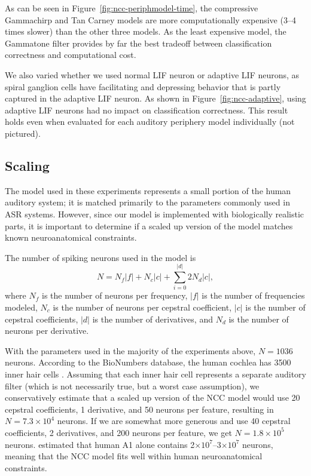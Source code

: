 
As can be seen in Figure~\ref{fig:ncc-periphmodel-time},
the compressive Gammachirp
and Tan Carney models are
more computationally expensive
(3--4 times slower)
than the other three models.
As the least expensive model,
the Gammatone filter
provides by far the best tradeoff
between classification correctness
and computational cost.


We also varied whether we used
normal LIF neuron or adaptive LIF neurons,
as spiral ganglion cells
have facilitating and depressing behavior
that is partly captured in the adaptive LIF neuron.
As shown in Figure~\ref{fig:ncc-adaptive},
using adaptive LIF neurons had no impact
on classification correctness.
This result holds even when
evaluated for each auditory periphery model
individually (not pictured).

\subsection{Scaling}

The model used in these experiments
represents a small portion
of the human auditory system;
it is matched primarily to the parameters
commonly used in ASR systems.
However, since our model is
implemented with biologically realistic parts,
it is important to determine
if a scaled up version of the model
matches known neuroanatomical constraints.

The number of spiking neurons used
in the model is
\begin{equation}
  N = N_f |f| + N_c |c| + \sum_{i=0}^{|d|} 2 N_d |c|,
\end{equation}
where $N_f$ is the number of neurons per frequency,
$|f|$ is the number of frequencies modeled,
$N_c$ is the number of neurons per cepstral coefficient,
$|c|$ is the number of cepstral coefficients,
$|d|$ is the number of derivatives,
and $N_d$ is the number of neurons per derivative.

With the parameters used
in the majority of the experiments above,
$N=1036$ neurons.
According to the BioNumbers database,
the human cochlea has 3500 inner hair cells
\citep[BNID~100697]{milo2010}.
Assuming that each inner hair cell
represents a separate auditory filter
(which is not necessarily true,
but a worst case assumption),
we conservatively estimate
that a scaled up version
of the NCC model
would use 20 cepstral coefficients,
1 derivative, and 50 neurons per feature,
resulting in $N=7.3 \times 10^4$ neurons.
If we are somewhat more generous
and use 40 cepstral coefficients,
2 derivatives, and 200 neurons per feature,
we get $N=1.8 \times 10^5$ neurons.
\citet{smiley2013} estimated
that human A1 alone contains
2$\times 10^7$--3$\times 10^7$ neurons,
meaning that the NCC model
fits well within human neuroanatomical constraints.

